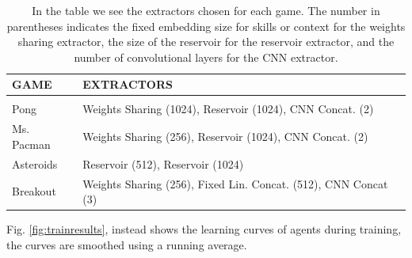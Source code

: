 \begin{table}[htbp]
    \begin{center}
        \begin{tabular}{ll}
            \multicolumn{1}{l}{\bf GAME}  &\multicolumn{1}{l}{\bf EXTRACTORS}
            \\ \hline \\
            Pong       & Weights Sharing (1024), Reservoir (1024), CNN Concat. (2) \\
            Ms. Pacman & Weights Sharing (256), Reservoir (1024), CNN Concat. (2) \\
            Asteroids         & Reservoir (512), Reservoir (1024) \\
            Breakout          & Weights Sharing (256), Fixed Lin. Concat. (512), CNN Concat (3) \\
        \end{tabular}
    \end{center}
    \caption{In the table we see the extractors chosen for each game. The number in parentheses indicates the fixed embedding size for skills or context for the weights sharing extractor, the size of the reservoir for the reservoir extractor, and the number of convolutional layers for the CNN extractor.}
    \label{tab:top3}
\end{table}

Fig. \ref{fig:trainresults}, instead shows the learning curves of agents during training, the curves are smoothed using a running average.

